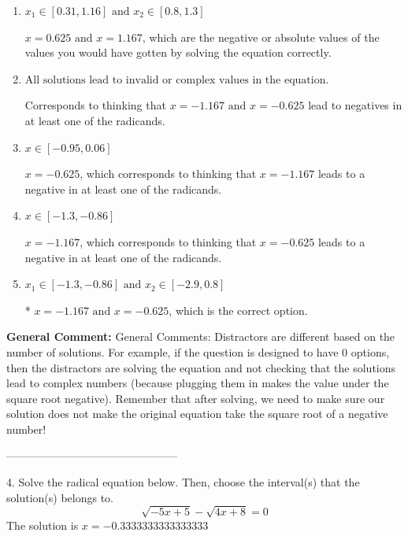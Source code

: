 \documentclass{extbook}[14pt]
\begin{document}
\begin{enumerate}[label=\Alph*.] 
\item $ x_1 \in [0.31, 1.16] \text{ and } x_2 \in [0.8,1.3] $ 

 $x = 0.625 \text{ and } x = 1.167$, which are the negative or absolute values of the values you would have gotten by solving the equation correctly. 
\item $ \text{All solutions lead to invalid or complex values in the equation.} $ 

 Corresponds to thinking that $x = -1.167 \text{ and } x = -0.625$ lead to negatives in at least one of the radicands. 
\item $ x \in [-0.95,0.06] $ 

 $x = -0.625$, which corresponds to thinking that $x = -1.167$ leads to a negative in at least one of the radicands. 
\item $ x \in [-1.3,-0.86] $ 

 $x = -1.167$, which corresponds to thinking that $x = -0.625$ leads to a negative in at least one of the radicands. 
\item $ x_1 \in [-1.3, -0.86] \text{ and } x_2 \in [-2.9,0.8] $ 

 * $x = -1.167 \text{ and } x = -0.625$, which is the correct option. 
\end{enumerate} 
 
\textbf{General Comment:} General Comments: Distractors are different based on the number of solutions. For example, if the question is designed to have 0 options, then the distractors are solving the equation and not checking that the solutions lead to complex numbers (because plugging them in makes the value under the square root negative). Remember that after solving, we need to make sure our solution does not make the original equation take the square root of a negative number! 

-----------------------------------------------

4. Solve the radical equation below. Then, choose the interval(s) that the solution(s) belongs to.
\[ \sqrt{-5 x + 5} - \sqrt{4 x + 8} = 0 \] 
The solution is $ x = -0.3333333333333333 $ 
\end{document}
